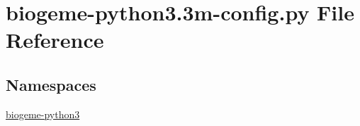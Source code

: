 \hypertarget{biogeme-python3_83m-config_8py}{\section{biogeme-\/python3.3m-\/config.py File Reference}
\label{biogeme-python3_83m-config_8py}
}
\subsection*{Namespaces}
\begin{DoxyCompactItemize}
\item 
 \hyperlink{namespacebiogeme-python3}{biogeme-\/python3}
\end{DoxyCompactItemize}

